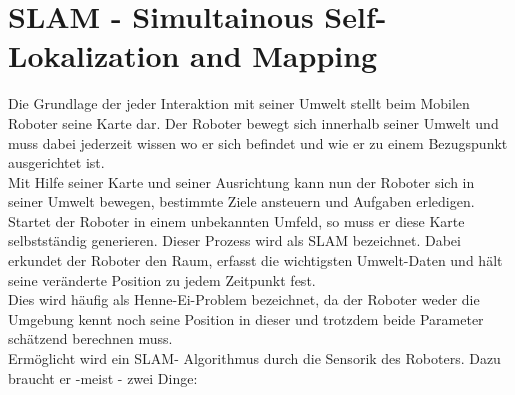 \documentclass[a4paper,cleardoubleempty,BCOR1cm]{book}
\begin{document}
\section{SLAM - Simultainous Self-Lokalization and Mapping }
Die Grundlage der jeder Interaktion mit seiner Umwelt stellt beim Mobilen Roboter seine Karte dar. Der Roboter bewegt sich innerhalb seiner Umwelt und muss dabei jederzeit wissen wo er sich befindet und wie er zu einem Bezugspunkt ausgerichtet ist. \\
Mit Hilfe seiner Karte und seiner Ausrichtung kann nun der Roboter sich in seiner Umwelt bewegen, bestimmte Ziele ansteuern und Aufgaben erledigen. Startet der Roboter in einem unbekannten Umfeld, so muss er diese Karte selbstständig generieren. Dieser Prozess wird als SLAM bezeichnet. Dabei erkundet der Roboter den Raum, erfasst die wichtigsten Umwelt-Daten und hält seine veränderte Position zu jedem Zeitpunkt fest. \\
Dies wird häufig als Henne-Ei-Problem bezeichnet, da der Roboter weder die Umgebung kennt noch seine Position in dieser und trotzdem beide Parameter schätzend berechnen muss. \\
Ermöglicht wird ein SLAM- Algorithmus durch die Sensorik des Roboters. Dazu braucht er -meist - zwei Dinge: 
\end{document}
